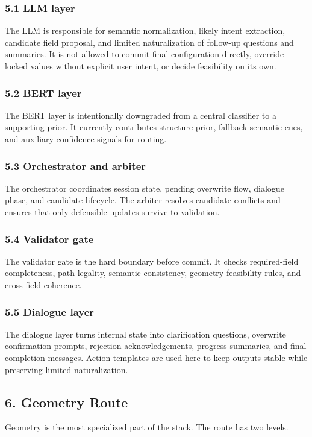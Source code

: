 \documentclass[11pt,a4paper]{ctexart}
\begin{document}
\subsubsection*{5.1 LLM layer}
The LLM is responsible for semantic normalization, likely intent extraction, candidate field proposal, and limited naturalization of follow-up questions and summaries. It is not allowed to commit final configuration directly, override locked values without explicit user intent, or decide feasibility on its own.
\subsubsection*{5.2 BERT layer}
The BERT layer is intentionally downgraded from a central classifier to a supporting prior. It currently contributes structure prior, fallback semantic cues, and auxiliary confidence signals for routing.
\subsubsection*{5.3 Orchestrator and arbiter}
The orchestrator coordinates session state, pending overwrite flow, dialogue phase, and candidate lifecycle. The arbiter resolves candidate conflicts and ensures that only defensible updates survive to validation.
\subsubsection*{5.4 Validator gate}
The validator gate is the hard boundary before commit. It checks required-field completeness, path legality, semantic consistency, geometry feasibility rules, and cross-field coherence.
\subsubsection*{5.5 Dialogue layer}
The dialogue layer turns internal state into clarification questions, overwrite confirmation prompts, rejection acknowledgements, progress summaries, and final completion messages. Action templates are used here to keep outputs stable while preserving limited naturalization.
\subsection*{6. Geometry Route}
Geometry is the most specialized part of the stack. The route has two levels.
\end{document}
